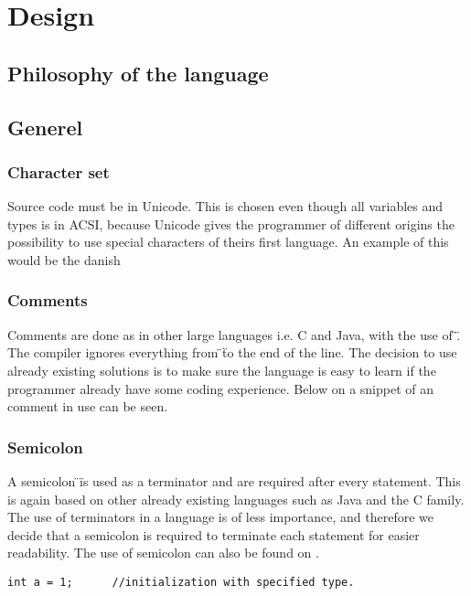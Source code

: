 \chapter{Design}
\label{cha:Design}
\section{Philosophy of the language}


\section{Generel}
\subsection{Character set}
Source code must be in Unicode.
This is chosen even though all variables and types is in ACSI, because Unicode gives the programmer of different origins the possibility to use special characters of theirs first language.
An example of this would be the danish %

\subsection{Comments}
Comments are done as in other large languages i.e. C and Java, with the use of \"\/\/\".
The compiler ignores everything from \"\/\/\" to the end of the line.
The decision  to use already existing solutions is to make sure the language is easy to learn if the programmer already have some coding experience.
Below on  a snippet of an comment in use can be seen.

\subsection{Semicolon}
A semicolon \"\;\" is used as a terminator and are required after every statement.
This is again based on other already existing languages such as Java and the C family.
The use of terminators in a language is of less importance, and therefore we decide that a semicolon is required to terminate each statement for easier readability.
The use of semicolon can also be found on .


\begin{lstlisting}[caption={Comment and Semicolon},label={lst:CommSemi}]
int a = 1;		//initialization with specified type.
\end{lstlisting}


